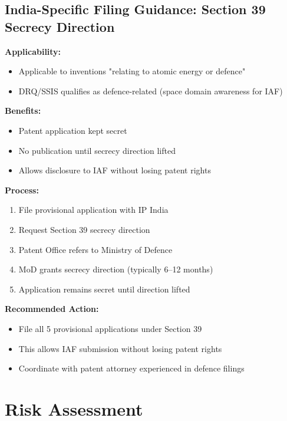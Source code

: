 \documentclass[11pt,a4paper]{article}
\begin{document}
\newpage

\subsection{India-Specific Filing Guidance: Section 39 Secrecy Direction}

\textbf{Applicability:}
\begin{itemize}
\item Applicable to inventions "relating to atomic energy or defence"
\item DRQ/SSIS qualifies as defence-related (space domain awareness for IAF)
\end{itemize}

\textbf{Benefits:}
\begin{itemize}
\item Patent application kept secret
\item No publication until secrecy direction lifted
\item Allows disclosure to IAF without losing patent rights
\end{itemize}

\textbf{Process:}
\begin{enumerate}
\item File provisional application with IP India
\item Request Section 39 secrecy direction
\item Patent Office refers to Ministry of Defence
\item MoD grants secrecy direction (typically 6--12 months)
\item Application remains secret until direction lifted
\end{enumerate}

\textbf{Recommended Action:}
\begin{itemize}
\item File all 5 provisional applications under Section 39
\item This allows IAF submission without losing patent rights
\item Coordinate with patent attorney experienced in defence filings
\end{itemize}

\newpage

\section{Risk Assessment}
\end{document}
